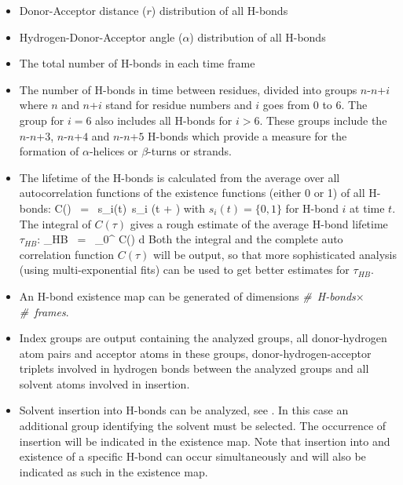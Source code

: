 \begin{itemize}
\item
Donor-Acceptor distance ($r$) distribution of all H-bonds
\item
Hydrogen-Donor-Acceptor angle ($\alpha$) distribution of all H-bonds 
\item
The total number of H-bonds in each time frame
\item
\newcommand{\nn}[1]{$n$-$n$+$#1$}
The number of H-bonds in time between residues, divided into groups
\nn{i} where $n$ and $n$+$i$ stand for residue numbers and $i$ goes
from 0 to 6. The group for $i=6$ also includes all H-bonds for
$i>6$. These groups include the \nn{3}, \nn{4} and \nn{5} H-bonds
which provide a measure for the formation of $\alpha$-helices or
$\beta$-turns or strands.
\item
The lifetime of the H-bonds is calculated from the average over all
autocorrelation functions of the existence functions (either 0 or 1)
of all H-bonds:
\beq
C(\tau) ~=~ \langle s_i(t)~s_i (t + \tau) \rangle
\label{eqn:hbcorr}
\eeq
with $s_i(t) = \{0,1\}$ for H-bond $i$ at time $t$. The integral of
$C(\tau)$ gives a rough estimate of the average H-bond lifetime
$\tau_{HB}$:
\beq
\tau_{HB} ~=~ \int_{0}^{\infty} C(\tau) d\tau
\label{eqn:hblife}
\eeq
Both the integral and the complete auto correlation function $C(\tau)$
will be output, so that more sophisticated analysis ({\eg}\@ using
multi-exponential fits) can be used to get better estimates for
$\tau_{HB}$.
\item
An H-bond existence map can be generated of dimensions {\em
\#~H-bonds}$\times${\em \#~frames}.
\item
Index groups are output containing the analyzed groups, all
donor-hydrogen atom pairs and acceptor atoms in these groups,
donor-hydrogen-acceptor triplets involved in hydrogen bonds between
the analyzed groups and all solvent atoms involved in insertion.
\item
Solvent insertion into H-bonds can be analyzed, see
. In this case an additional group identifying
the solvent must be selected. The occurrence of insertion will be
indicated in the existence map. Note that insertion into and existence
of a specific H-bond can occur simultaneously and will also be
indicated as such in the existence map.
\end{itemize}

